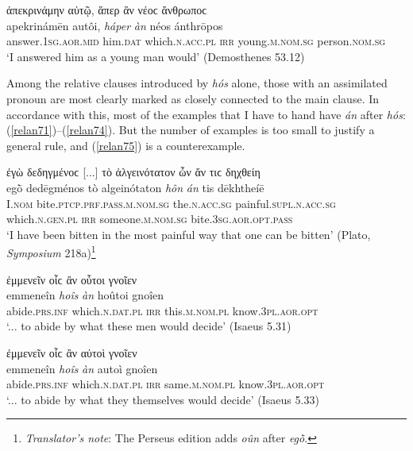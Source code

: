 \begin{exe}
\ex ἀπεκρινάμην αὐτῷ, ἅπερ ἂν νέοϲ ἄνθρωποϲ\\
\gll apekrinámēn autôi, \emph{háper} \emph{àn} néos ánthrōpos\\
answer.\textsc{1sg.aor.mid} him.\textsc{dat} which.\textsc{n.acc.pl} \textsc{irr} young.\textsc{m.nom.sg} person.\textsc{nom.sg}\\
\trans `I answered him as a young man would' (Demosthenes 53.12)
\label{relan70}
\end{exe}

Among the relative clauses introduced by \emph{hós} alone, those with an assimilated pronoun are most clearly marked as closely connected to the main clause. In accordance with this, most of the examples that I have to hand have \emph{án} after \emph{hós}: (\ref{relan71})--(\ref{relan74}). But the number of examples is too small to justify a general rule, and (\ref{relan75}) is a counterexample.

\begin{exe}
\ex ἐγὼ δεδηγμένοϲ {[}...{]} τὸ ἀλγεινότατον ὧν ἄν τιϲ δηχθείη\\
\gll egṑ dedēgménos tò algeinótaton \emph{hôn} \emph{án} tis dēkhtheíē\\
I.\textsc{nom} bite.\textsc{ptcp.prf.pass.m.nom.sg} the.\textsc{n.acc.sg} painful.\textsc{supl.n.acc.sg} which.\textsc{n.gen.pl} \textsc{irr} someone.\textsc{m.nom.sg} bite.\textsc{3sg.aor.opt.pass}\\
\trans `I have been bitten in the most painful way that one can be bitten' (Plato, \textit{Symposium} 218a)\footnote{\emph{Translator's note}: The Perseus edition adds \textit{oûn} after \textit{egṑ}.}
\label{relan71}
\end{exe}

\begin{exe}
\ex ἐμμενεῖν οἷϲ ἂν οὗτοι γνοῖεν\\
\gll emmeneîn \emph{hoîs} \emph{àn} hoûtoi gnoîen\\
abide.\textsc{prs.inf} which.\textsc{n.dat.pl} \textsc{irr} this.\textsc{m.nom.pl} know.\textsc{3pl.aor.opt}\\
\trans `... to abide by what these men would decide' (Isaeus 5.31)
\label{relan72}
\end{exe}

\begin{exe}
\ex ἐμμενεῖν οἷϲ ἂν αὐτοὶ γνοῖεν\\
\gll emmeneîn \emph{hoîs} \emph{àn} autoì gnoîen\\
abide.\textsc{prs.inf} which.\textsc{n.dat.pl} \textsc{irr} same.\textsc{m.nom.pl} know.\textsc{3pl.aor.opt}\\
\trans `... to abide by what they themselves would decide' (Isaeus 5.33)
\label{relan73}
\end{exe}


